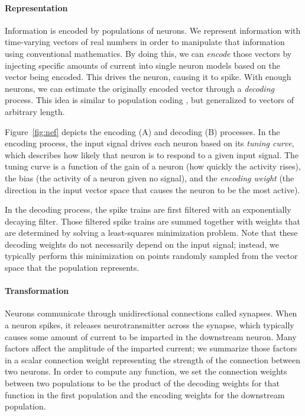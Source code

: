 \documentclass{frontiersSCNS}
\begin{document}
\paragraph{Representation}
Information is encoded by populations of neurons.
We represent information
with time-varying vectors of real numbers
in order to manipulate that information
using conventional mathematics.
By doing this, we can \textit{encode}
those vectors by injecting
specific amounts of current into
single neuron models based on
the vector being encoded.
This drives the neuron,
causing it to spike.
With enough neurons,
we can estimate the originally encoded vector
through a \textit{decoding} process.
This idea is similar to population coding
\citep{georgopoulos1986}, but generalized
to vectors of arbitrary length.

Figure~\ref{fig:nef} depicts
the encoding (A) and decoding (B) processes.
In the encoding process, the input signal drives
each neuron based on its \textit{tuning curve},
which describes how likely
that neuron is to respond to a given input signal.
The tuning curve is a function of the gain
of a neuron (how quickly the activity rises),
the bias (the activity of a neuron given no signal),
and the \textit{encoding weight}
(the direction in the input vector space
that causes the neuron to be the most active).

In the decoding process,
the spike trains are first filtered
with an exponentially decaying filter.
Those filtered spike trains are summed together
with weights that are determined
by solving a least-squares minimization problem.
Note that these decoding weights
do not necessarily depend on the input signal;
instead, we typically perform
this minimization on points
randomly sampled from
the vector space
that the population represents.

\paragraph{Transformation}  %
Neurons communicate through
unidirectional connections called synapses.
When a neuron spikes,
it releases neurotransmitter across the synapse,
which typically causes some amount of current
to be imparted in the downstream neuron.
Many factors affect the
amplitude of the imparted current;
we summarize those factors
in a scalar connection weight
representing the strength
of the connection between two neurons.
In order to compute any function,
we set the connection weights between
two populations to be the product of
the decoding weights for that function
in the first population
and the encoding weights
for the downstream population.
\end{document}
